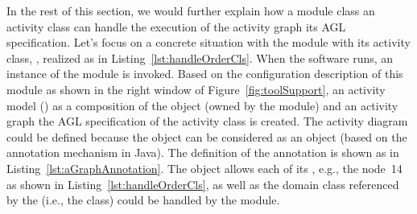 In the rest of this section, we would further explain how a module class \wrt an activity class can handle the execution of the activity graph \wrt its AGL specification. Let's focus on a concrete situation with the   module with its activity class, , realized as in Listing~\ref{lst:handleOrderCls}.
%
%
When the software runs, an instance of the  module is invoked. Based on the configuration description of this module as shown in the right window of Figure~\ref{fig:toolSupport}, an activity model () as a composition of the  object (owned by the  module) and an activity graph \wrt the AGL specification of the activity class  is created. The activity diagram could be defined because the  object can be considered as an  object (based on the annotation mechanism in Java). The definition of the annotation  is shown as in Listing~\ref{lst:aGraphAnnotation}. 
%
The  object allows each of its , e.g., the  \wrt node~14 as shown in Listing~\ref{lst:handleOrderCls}, as well as the domain class referenced by the  (i.e., the  class) could be handled by the  module. 


























 